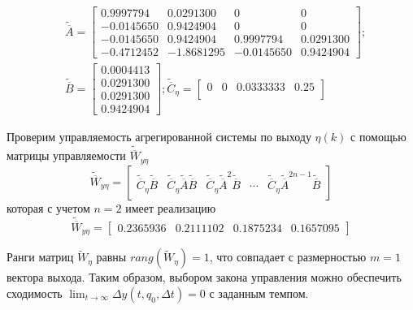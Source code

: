 \begin{align*}
	&\tilde{\overline{A}} =
	\begin{bmatrix}
    0.9997794  &  0.0291300 &0& 0 \\
	- 0.0145650  &  0.9424904  &0& 0\\
	- 0.0145650  &  0.9424904 &  0.9997794  &  0.0291300\\  
	- 0.4712452 & - 1.8681295  & - 0.0145650  &  0.9424904  
	\end{bmatrix};\\
	&\tilde{\overline{B}} =
	\begin{bmatrix}
       0.0004413\\  
		0.0291300 \\ 
		0.0291300  \\
		0.9424904 
	\end{bmatrix};
	\tilde{\overline{C}}_{\eta} =
	\begin{bmatrix}
		0&0&0.0333333 &   0.25\\
	\end{bmatrix}
\end{align*}

Проверим управляемость агрегированной системы по выходу $\eta(k)$ с помощью матрицы управляемости $\tilde{\overline{W}}_{y \eta}$
\begin{equation}
	\tilde{\overline{W}}_{y \eta} =
	\begin{bmatrix}
	\tilde{\overline{C}}_{\eta} \tilde{\overline{B}} &
	\tilde{\overline{C}}_{\eta} \tilde{\overline{A}} \tilde{\overline{B}} &
	\tilde{\overline{C}}_{\eta} \tilde{\overline{A}}^2 \tilde{\overline{B}} &		
	\cdots &
	\tilde{\overline{C}}_{\eta} \tilde{\overline{A}}^{2n-1} \tilde{\overline{B}}
	\end{bmatrix}
\end{equation}
которая с учетом $n=2$ имеет реализацию
\begin{equation*}
	\tilde{\overline{W}}_{y \eta} =
	\begin{bmatrix}
	0.2365936  &  0.2111102  &  0.1875234  &  0.1657095  
	\end{bmatrix}
\end{equation*}

Ранги матриц $\tilde{W}_{\eta}$ равны $rang(\tilde{W}_{\eta}) = 1$, что совпадает с размерностью $m = 1$ вектора выхода. Таким образом, выбором закона
управления можно обеспечить сходимость $\lim_{t  \to \infty} \Delta y (t,q_0,\Delta t) = 0$ с заданным темпом. 



\newpage